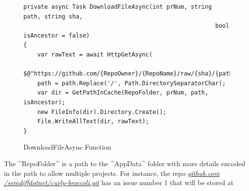\documentclass[draftclsnofoot,onecolumn]{IEEEtran}
\begin{document}
\begin{figure}[p]
\centering
\begin{lstlisting}
private async Task DownloadFileAsync(int prNum, string path, string sha, 
                                                       bool isAncestor = false)
{
    var rawText = await HttpGetAsync(
	           $@"https://github.com/{RepoOwner}/{RepoName}/raw/{sha}/{path}");
    path = path.Replace('/', Path.DirectorySeparatorChar);
    var dir = GetPathInCache(RepoFolder, prNum, path, isAncestor);
    new FileInfo(dir).Directory.Create();
    File.WriteAllText(dir, rawText);
}
\end{lstlisting}
\caption{DownloadFileAsync Function}
\label{DownloadFileAsync}
\end{figure}

The ^RepoFolder^ is a path to the ^AppData^ folder with more details 
encoded in the path to allow multiple projects. For instance, the repo 
\textit{\url{github.com /semdiffdotnet/curly-broccoli.git}} has an issue 
number 1 that will be stored at 
\end{document}
